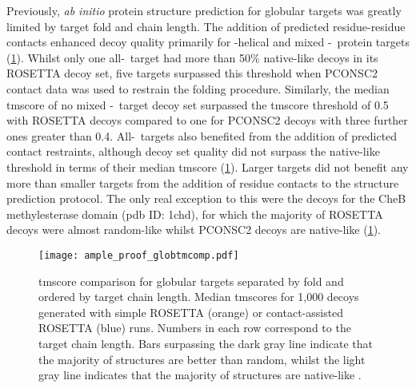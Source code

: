 Previously, \textit{ab initio} protein structure prediction for globular targets was greatly limited by target fold and chain length. The addition of predicted residue-residue contacts enhanced decoy quality primarily for \textalpha-helical and mixed \textalpha-\textbeta\ protein targets (\cref{fig:ample_proof_globtmcomp}). Whilst only one all-\textalpha\ target had more than 50\% native-like decoys in its ROSETTA decoy set, five targets surpassed this threshold when PCONSC2 contact data was used to restrain the folding procedure. Similarly, the median \gls{tmscore} of no mixed \textalpha-\textbeta\ target decoy set surpassed the \gls{tmscore} threshold of 0.5 with ROSETTA decoys compared to one for PCONSC2 decoys with three further ones greater than 0.4. All-\textbeta\ targets also benefited from the addition of predicted contact restraints, although decoy set quality did not surpass the native-like threshold in terms of their median \gls{tmscore} (\cref{fig:ample_proof_globtmcomp}). Larger targets did not benefit any more than smaller targets from the addition of residue contacts to the structure prediction protocol. The only real exception to this were the decoys for the CheB methylesterase domain (\gls{pdb} ID: 1chd), for which the majority of ROSETTA decoys were almost random-like whilst PCONSC2 decoys are native-like (\cref{fig:ample_proof_globtmcomp}).

\begin{figure}[H]
    \centering
    \texttt{[image: ample\_proof\_globtmcomp.pdf]}
    \caption[TM-score comparison for globular targets separated by fold]{\gls{tmscore} comparison for globular targets separated by fold and ordered by target chain length. Median \gls{tmscore}s for 1,000 decoys generated with simple ROSETTA (orange) or contact-assisted ROSETTA (blue) runs. Numbers in each row correspond to the target chain length. Bars surpassing the dark gray line indicate that the majority of structures are better than random, whilst the light gray line indicates that the majority of structures are native-like \cite{Xu2010-kr}.}
    \label{fig:ample_proof_globtmcomp}
\end{figure}

